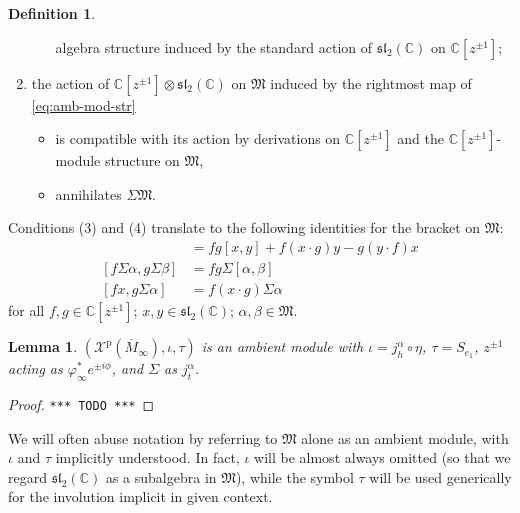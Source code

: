 \documentclass{article}
\def\MISS{\texttt{*** TODO ***}}
\def\fsl{\mathfrak{sl}}
\def\fM{\mathfrak{M}}
\def\CC{\mathbb{C}}
\def\XX{\mathscr{X}}
\def\inv{\tau} %
\def\p{\mathrm{p}}
\newtheorem{lem}{Lemma}
\theoremstyle{definition}
\newtheorem{defn}{Definition}
\begin{document}
\begin{defn}
\begin{enumerate}
\begin{itemize}
        algebra structure induced by the standard action of $\fsl_2(\CC)$ on $\CC[z^{\pm1}]$;
\end{itemize}
\item the action of $\CC[z^{\pm 1}]\otimes\fsl_2(\CC)$ on $\fM$ induced by
        the rightmost map of \eqref{eq:amb-mod-str}
        \begin{itemize}
                \item is compatible with its action by derivations on $\CC[z^{\pm1}]$ and
                        the $\CC[z^{\pm1}]$-module structure on $\fM$,
                \item annihilates $\Sigma\fM$.
        \end{itemize}
\end{enumerate}
Conditions (3) and (4) translate to the
following identities for the bracket on $\fM$:
\begin{align*}
        [f x, g y] &= fg[x,y] + f(x\cdot g)y-g(y\cdot f)x  \\
        [f \Sigma\alpha, g\Sigma\beta ] &= fg \Sigma[\alpha,\beta]\\
        [f x, g \Sigma \alpha] &=f (x\cdot g)\Sigma\alpha  
\end{align*}
for all $f,g \in \CC[z^{\pm1}]$; $x,y \in \fsl_2(\CC)$; $\alpha,\beta \in \fM$.
\end{defn}

\begin{lem} \label{lem:smod} $(\XX^\p(\overline M_\infty),\iota,\inv)$ is an ambient module
        with $\iota=j^\alpha_h\circ \eta$, $\inv=S_{e_1}$, $z^{\pm1}$ acting as $\varphi_\infty^* e^{\pm i\phi}$, and
        $\Sigma$ as $j^\alpha_t$.
\end{lem}
\begin{proof}\MISS\end{proof}

We will often abuse notation by referring to $\fM$ alone
as an ambient module, with $\iota$ and $\inv$ implicitly
understood. In fact, $\iota$ will be almost always omitted
(so that we regard $\fsl_2(\CC)$ as a subalgebra in $\fM$),
while the symbol $\inv$ will be used generically for the
involution implicit in given context.
\end{document}
